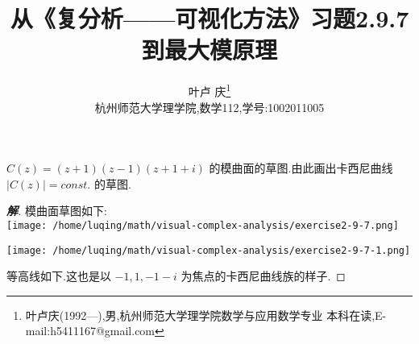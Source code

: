 \documentclass[a4paper]{article}
\begin{document}
\title{\bf{从《复分析——可视化方法》习题2.9.7到最大模原理}} \author{\small{叶卢
    庆\footnote{叶卢庆(1992---),男,杭州师范大学理学院数学与应用数学专业
      本科在读,E-mail:h5411167@gmail.com}}\\{\small{杭州师范大学理学院,数学112,学号:1002011005}}}
\maketitle
\begin{enumerate}
 $C(z)=(z+1)(z-1)(z+1+i)$ 的模曲面的草图.由此画出卡西尼曲线
$|C(z)|=const.$ 的草图.
\begin{proof}[\bf{解}]
模曲面草图如下:\\
\texttt{[image: /home/luqing/math/visual-complex-analysis/exercise2-9-7.png]}

\texttt{[image: /home/luqing/math/visual-complex-analysis/exercise2-9-7-1.png]}

等高线如下.这也是以 $-1,1,-1-i$ 为焦点的卡西尼曲线族的样子.


\end{proof}
\end{enumerate}
\end{document}
